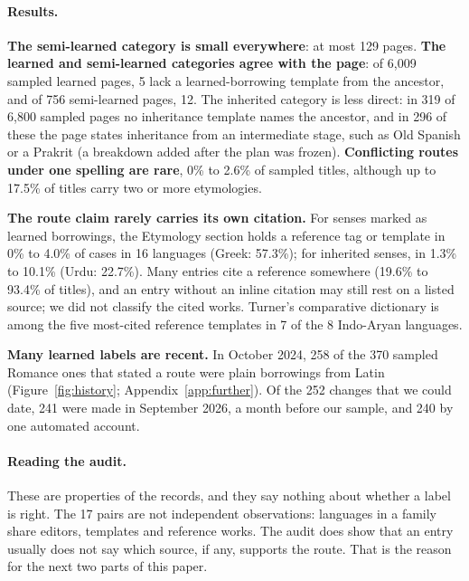 \documentclass[11pt]{article}
\begin{document}
\paragraph{Results.} \textbf{The semi-learned category is small everywhere}: at most 129 pages. \textbf{The learned and semi-learned categories agree with the page}: of 6,009 sampled learned pages, 5 lack a learned-borrowing template from the ancestor, and of 756 semi-learned pages, 12. The inherited category is less direct: in 319 of 6,800 sampled pages no inheritance template names the ancestor, and in 296 of these the page states inheritance from an intermediate stage, such as Old Spanish or a Prakrit (a breakdown added after the plan was frozen). \textbf{Conflicting routes under one spelling are rare}, 0\% to 2.6\% of sampled titles, although up to 17.5\% of titles carry two or more etymologies.

\textbf{The route claim rarely carries its own citation.} For senses marked as learned borrowings, the Etymology section holds a reference tag or template in 0\% to 4.0\% of cases in 16 languages (Greek: 57.3\%); for inherited senses, in 1.3\% to 10.1\% (Urdu: 22.7\%). Many entries cite a reference somewhere (19.6\% to 93.4\% of titles), and an entry without an inline citation may still rest on a listed source; we did not classify the cited works. Turner's comparative dictionary is among the five most-cited reference templates in 7 of the 8 Indo-Aryan languages.

\textbf{Many learned labels are recent.} In October 2024, 258 of the 370 sampled Romance ones that stated a route were plain borrowings from Latin (Figure~\ref{fig:history}; Appendix~\ref{app:further}). Of the 252 changes that we could date, 241 were made in September 2026, a month before our sample, and 240 by one automated account.

\paragraph{Reading the audit.} These are properties of the records, and they say nothing about whether a label is right. The 17 pairs are not independent observations: languages in a family share editors, templates and reference works. The audit does show that an entry usually does not say which source, if any, supports the route. That is the reason for the next two parts of this paper.
\end{document}

